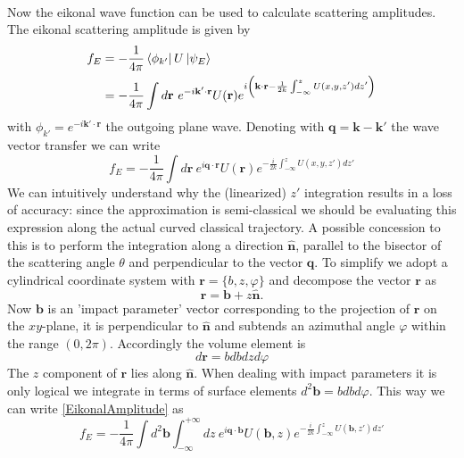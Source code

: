 \documentclass[11pt]{article}
\numberwithin{equation}{section}
\begin{document}
\\
Now the eikonal wave function can be used to calculate scattering amplitudes. The eikonal scattering amplitude is given by
\begin{align}
f_E &= -\frac{1}{4\pi}\bra{\phi_{k'}}U \ket{\psi_E}\\	
& = -\frac{1}{4\pi}\int d\mathbf{r} ~e^{-i\mathbf{k}' \cdot \mathbf{r}} U(\mathbf{r}) e^{i\left(\mathbf{k}\cdot \mathbf{r} - \frac{1}{2k}\int^{z}_{-\infty} U(x,y,z')dz'\right)}
\end{align}
with $\phi_{k'} = e^{-i\mathbf{k}'\cdot\mathbf{r}}$ the outgoing plane wave. Denoting with $\mathbf{q} = \mathbf{k} - \mathbf{k}'$ the wave vector transfer we can write
\begin{equation}\label{EikonalAmplitude}
	f_E = -\frac{1}{4\pi}\int d\mathbf{r} ~e^{i\mathbf{q} \cdot \mathbf{r}} U(\mathbf{r}) e^{- \frac{i}{2k}\int^{z}_{-\infty} U(x,y,z')dz'}
\end{equation}
We can intuitively understand why the (linearized) $z'$ integration results in a loss of accuracy: since the approximation is semi-classical we should be evaluating this expression along the actual curved classical trajectory. A possible concession to this is to perform the integration along a direction $\mathbf{\hat{n}}$, parallel to the bisector of the scattering angle $\theta$ and perpendicular to the vector $\mathbf{q}$. To simplify we adopt a cylindrical coordinate system \cite{Canto13} with $\mathbf{r} = \lbrace b,z,\varphi\rbrace$ and decompose the vector $\mathbf{r}$ as
\begin{equation}\label{cylindrical}
	\mathbf{r} = \mathbf{b} + z\mathbf{\hat{n}}.
\end{equation}
Now $\mathbf{b}$ is an 'impact parameter' vector corresponding to the projection of $\mathbf{r}$ on the $xy$-plane, it is perpendicular to $\mathbf{\hat{n}}$ and subtends an azimuthal angle $\varphi$ within the range $(0,2\pi)$. Accordingly the volume element is
\begin{equation}
	d\mathbf{r} = bdbdzd\varphi
\end{equation} 
The $z$ component of $\mathbf{r}$ lies along $\mathbf{\hat{n}}$. When dealing with impact parameters it is only logical we integrate in terms of surface elements $d^2\mathbf{b} = bdbd\varphi$. This way we can write \eqref{EikonalAmplitude} as
\begin{equation}
	f_E = -\frac{1}{4\pi}\int d^2\mathbf{b} \int^{+\infty}_{-\infty} dz ~e^{i\mathbf{q}\cdot\mathbf{b}}U(\mathbf{b},z)e^{-\frac{i}{2k}\int^z_{-\infty} U(\mathbf{b},z')dz'}
\end{equation}
\end{document}
